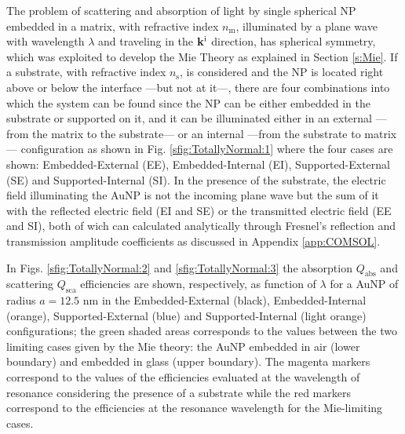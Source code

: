 
The problem of scattering and absorption of light by single spherical NP embedded in a matrix, with refractive index $n_\text{m}$, illuminated by a plane wave with wavelength $\lambda$  and traveling in the  $\vb{k}^\text{i}$ direction, has spherical symmetry, which was exploited to develop the Mie Theory as explained in Section \ref{s:Mie}. If a substrate, with refractive index $n_\text{s}$, is considered and the NP is located right above or below the interface ---but not at it---, there are four combinations into which the system can be found since the NP can be either embedded  in the substrate or supported on it, and it can be illuminated either in an external ---from the matrix to the substrate--- or an internal ---from the substrate to matrix--- configuration as shown in Fig. \ref{sfig:TotallyNormal:1} where the four cases are shown: Embedded-External (EE), Embedded-Internal (EI), Supported-External (SE) and Supported-Internal (SI). In the  presence of the substrate, the electric field illuminating the AuNP is not the incoming plane wave but the sum of it with the reflected electric field (EI and SE) or the transmitted electric field (EE and SI), both of wich can calculated analytically through Fresnel's reflection and transmission amplitude coefficients as discussed in Appendix \ref{app:COMSOL}.

In Figs. \ref{sfig:TotallyNormal:2} and \ref{sfig:TotallyNormal:3}  the absorption $Q_\text{abs}$ and scattering $Q_\text{sca}$ efficiencies are shown, respectively, as function of $\lambda$ for a AuNP of radius $a = 12.5$ nm in the Embedded-External (black), Embedded-Internal (orange), Supported-External (blue) and Supported-Internal (light orange) configurations; the green shaded areas corresponds to the values between the two limiting cases given by the Mie theory: the AuNP embedded in air (lower boundary) and embedded in glass (upper boundary). The magenta markers correspond to the values of the efficiencies evaluated at the wavelength of resonance considering the presence of a substrate while the red markers correspond to the efficiencies at the resonance wavelength for the Mie-limiting cases.


